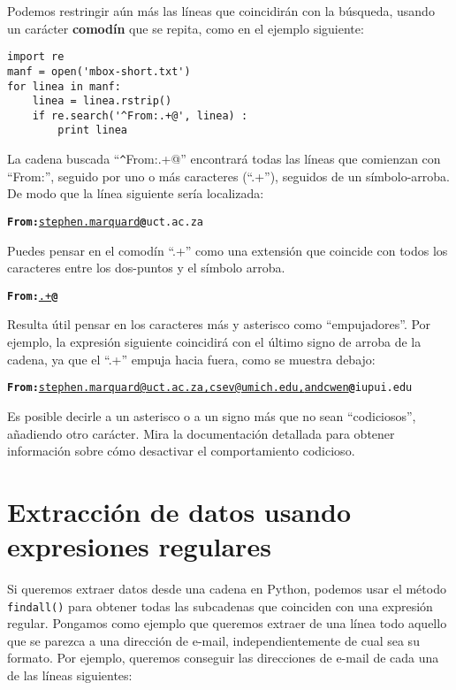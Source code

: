 Podemos restringir aún más las líneas que coincidirán con la búsqueda, usando un carácter {\bf comodín}
que se repita, como en el ejemplo siguiente:

\beforeverb
\begin{verbatim}
import re
manf = open('mbox-short.txt')
for linea in manf:
    linea = linea.rstrip()
    if re.search('^From:.+@', linea) :
        print linea
\end{verbatim}
\afterverb
%
La cadena buscada ``\verb"^"From:.+@'' encontrará todas las líneas que comienzan con ``From:'',
seguido por uno o más caracteres (``.+''), seguidos de un símbolo-arroba. De modo que la
línea siguiente sería localizada:

\beforeverb
\begin{alltt}
{\bf From:}\underline{ stephen.marquard}{\bf @}uct.ac.za
\end{alltt}
\afterverb

Puedes pensar en el comodín ``.+'' como una extensión que coincide con todos los caracteres
entre los dos-puntos y el símbolo arroba.

\beforeverb
\begin{alltt}
{\bf From:}\underline{.+}{\bf @}
\end{alltt}
\afterverb

Resulta útil pensar en los caracteres más y asterisco como ``empujadores''. Por ejemplo, la expresión
siguiente coincidirá con el último signo de arroba de la cadena, ya que el ``.+'' empuja hacia fuera,
como se muestra debajo:

\beforeverb
\begin{alltt}
{\bf From:}\underline{ stephen.marquard@uct.ac.za, csev@umich.edu, and cwen}{\bf @}iupui.edu
\end{alltt}
\afterverb

Es posible decirle a un asterisco o a un signo más que no sean ``codiciosos'', añadiendo
otro carácter. Mira la documentación detallada para obtener información sobre cómo desactivar
el comportamiento codicioso.

\section{Extracción de datos usando expresiones regulares}

Si queremos extraer datos desde una cadena en Python, podemos usar el método {\tt findall()} para
obtener todas las subcadenas que coinciden con una expresión regular. Pongamos como ejemplo que
queremos extraer de una línea todo aquello que se parezca a una dirección de e-mail, independientemente
de cual sea su formato. Por ejemplo, queremos conseguir las direcciones de e-mail de cada una de las
líneas siguientes:

